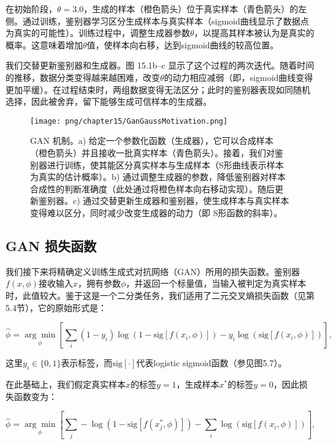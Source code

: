 在初始阶段，\(\theta = 3.0\)，生成的样本（橙色箭头）位于真实样本（青色箭头）的左侧。通过训练，鉴别器学习区分生成样本与真实样本（sigmoid曲线显示了数据点为真实的可能性）。训练过程中，调整生成器参数\(\theta\)，以提高其样本被认为是真实的概率。这意味着增加\(\theta\)值，使样本向右移，达到sigmoid曲线的较高位置。

我们交替更新鉴别器和生成器。图 15.1b–c 显示了这个过程的两次迭代。随着时间的推移，数据分类变得越来越困难，改变\(\theta\)的动力相应减弱（即，sigmoid曲线变得更加平缓）。在过程结束时，两组数据变得无法区分；此时的鉴别器表现如同随机选择，因此被舍弃，留下能够生成可信样本的生成器。

\begin{figure}[ht!]
\centering
\texttt{[image: png/chapter15/GanGaussMotivation.png]}
\caption{GAN 机制。a) 给定一个参数化函数（生成器），它可以合成样本（橙色箭头）并且接收一批真实样本（青色箭头）。接着，我们对鉴别器进行训练，使其能区分真实样本与生成样本（S形曲线表示样本为真实的估计概率）。b) 通过调整生成器的参数，降低鉴别器对样本合成性的判断准确度（此处通过将橙色样本向右移动实现）。随后更新鉴别器。c) 通过交替更新生成器和鉴别器，使生成样本与真实样本变得难以区分，同时减少改变生成器的动力（即 S形函数的斜率）。}
\end{figure}



\subsection{GAN 损失函数}
我们接下来将精确定义训练生成式对抗网络（GAN）所用的损失函数。鉴别器\(f(x, \phi)\)接收输入\(x\)，拥有参数\(\phi\)，并返回一个标量值，当输入被判定为真实样本时，此值较大。鉴于这是一个二分类任务，我们适用了二元交叉熵损失函数（见第5.4节），它的原始形式是：

\begin{equation}
\hat{\phi} = \underset{\phi}{\arg\min} \left[ \sum_i (1 - y_i) \log \left( 1 - \text{sig}[f(x_i, \phi)] \right) - y_i \log \left( \text{sig}[f(x_i, \phi)] \right) \right], 
\end{equation}

这里\(y_i \in \{0, 1\}\)表示标签，而\(\text{sig}[\cdot]\)代表logistic sigmoid函数（参见图5.7）。

在此基础上，我们假定真实样本\(x\)的标签\(y = 1\)，生成样本\(x^*\)的标签\(y = 0\)，因此损失函数变为：

\begin{equation}
\hat{\phi} = \underset{\phi}{\arg\min} \left[ \sum_j -\log \left( 1 - \text{sig}[f(x_j^*, \phi)] \right) - \sum_i \log \left( \text{sig}[f(x_i, \phi)] \right) \right], 
\end{equation}

